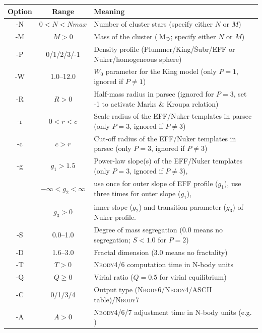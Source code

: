 \documentclass[useAMS,usenatbib]{mn2e}
\newcommand{\msun}{\mbox{$\,{\rm M}_\odot$}}
\begin{document}
\pagestyle{empty}
\begin{table}
\begin{minipage}{\textwidth}
\centering
\footnotesize{
\begin{tabular}{ccl}
Option & Range & Meaning\\ \hline
      -N & $0<N<Nmax$ & Number of cluster stars (specify either $N$ or $M$)\\                                 
      -M & $M>0$ & Mass of the cluster ($\msun$; specify either $N$ or $M$)\\           
      -P & 0/1/2/3/-1& Density profile (Plummer/King/\v{S}ubr/EFF or Nuker/homogeneous sphere)\\             
      -W & 1.0--12.0 & $W_0$ parameter for the King model (only $P=1$, ignored if $P\neq 1$)\\                       
      -R & $R>0$ & Half-mass radius in parsec (ignored for $P = 3$, set -1 to activate Marks \& Kroupa relation)\\         
      -r & $0<r<c$ & Scale radius of the EFF/Nuker templates in parsec  (only $P=3$, ignored if $P\neq 3$)\\         
      -c & $c>r$ & Cut-off radius of the EFF/Nuker templates in parsec (only $P=3$, ignored if $P\neq 3$)\\       
      -g & $g_1>1.5$ & Power-law slope(s) of the EFF/Nuker templates (only $P=3$, ignored if $P\neq 3$), \\           
      	   & $-\infty<g_2<\infty$  & use once for outer slope of EFF profile ($g_1$), use three times for outer slope ($g_1$), \\
	   &$g_3> 0$ & inner slope ($g_2$) and transition parameter ($g_3$) of Nuker profile.\\ 
      -S & 0.0--1.0 & Degree of mass segregation (0.0 means no segregation; $S<1.0$ for $P=2$)\\
      -D & 1.6--3.0 & Fractal dimension (3.0 means no fractality)\\          
      -T & $T>0$ & \textsc{Nbody4/6} computation time in N-body units\\                            
      -Q & $Q\ge0$ & Virial ratio ($Q = 0.5$ for virial equilibrium)\\                                     
      -C & 0/1/3/4 & Output type (\textsc{Nbody6}/\textsc{Nbody4}/ASCII table)/\textsc{Nbody7}\\    
      -A & $A>0$ & \textsc{Nbody4/6/7} adjustment time in N-body units (e.g. \citealt{Heggie03})\\                            

\end{tabular}}
\end{minipage}
\end{table}
\end{document}
